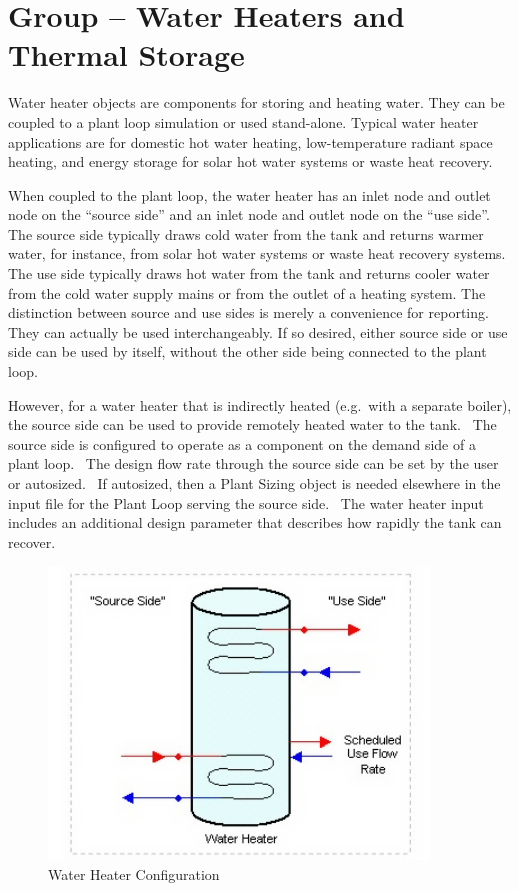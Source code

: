 \section{Group -- Water Heaters and Thermal Storage}\label{group-water-heaters}

Water heater objects are components for storing and heating water. They can be coupled to a plant loop simulation or used stand-alone. Typical water heater applications are for domestic hot water heating, low-temperature radiant space heating, and energy storage for solar hot water systems or waste heat recovery.

When coupled to the plant loop, the water heater has an inlet node and outlet node on the ``source side'' and an inlet node and outlet node on the ``use side''. The source side typically draws cold water from the tank and returns warmer water, for instance, from solar hot water systems or waste heat recovery systems. The use side typically draws hot water from the tank and returns cooler water from the cold water supply mains or from the outlet of a heating system. The distinction between source and use sides is merely a convenience for reporting. They can actually be used interchangeably. If so desired, either source side or use side can be used by itself, without the other side being connected to the plant loop.

However, for a water heater that is indirectly heated (e.g.~with a separate boiler), the source side can be used to provide remotely heated water to the tank.~ The source side is configured to operate as a component on the demand side of a plant loop.~ The design flow rate through the source side can be set by the user or autosized.~ If autosized, then a Plant Sizing object is needed elsewhere in the input file for the Plant Loop serving the source side.~ The water heater input includes an additional design parameter that describes how rapidly the tank can recover.

\begin{figure}[hbtp] %
\centering
\includegraphics[width=0.9\textwidth, height=0.9\textheight, keepaspectratio=true]{media/image191.png}
\caption{Water Heater Configuration \protect \label{fig:water-heater-configuration}}
\end{figure}

